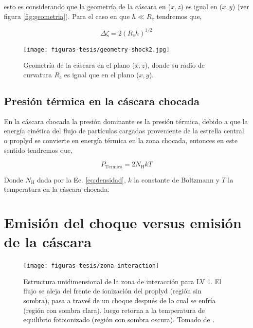  esto es considerando que la geometría de la cáscara en (\(x, z\)) es igual en (\(x, y\)) (ver figura  \ref{fig:geometria}). Para el caso en que \(h \ll R_{c}\) tendremos que,

\begin{equation}
  \label{eq:vision}
  \Delta \zeta = 2(R_{c}h)^{1/2}
\end{equation}

\begin{figure}
  \centering
  \texttt{[image: figuras-tesis/geometry-shock2.jpg]}
  \caption{Geometría de la cáscara en el plano (\(x, z\)), donde su radio de curvatura \(R_{c}\) es igual que en el plano (\(x, y\)).}
  \label{fig:geometria1}
\end{figure}

\subsection{Presión térmica en la cáscara chocada}
\label{sec:pressur-thermal}

En la cáscara chocada la presión dominante es la presión térmica, debido a que la energía cinética del flujo de partículas cargadas proveniente de la estrella central o proplyd se convierte en energía térmica en la zona chocada, entonces en este sentido tendremos que,

\begin{equation}
  \label{eq:presion-cascara}
  P_{\text{Termica}} = 2 N_{\text{H}} k T 
\end{equation}
 
Donde \(N_{\text{H}}\) dada por la Ec. \ref{eq:densidad}, \(k\) la constante de Boltzmann y \(T\) la temperatura en la cáscara chocada.\\

\section{Emisión del choque versus emisión de la cáscara}
\label{sec:emis}

\begin{figure}
  \centering
  \texttt{[image: figuras-tesis/zona-interaction]}
  \caption{Estructura unidimensional de la zona de interacción para LV 1. El flujo se aleja del frente de ionización del proplyd (región sin sombra), pasa a traveś de un choque después de lo cual se enfría (región con sombra clara), luego  retorna a la temperatura de equilibrio fotoionizado (región con sombra oscura). Tomado de \citet{Henney:2002}.}
  \label{fig:cool}
\end{figure}

